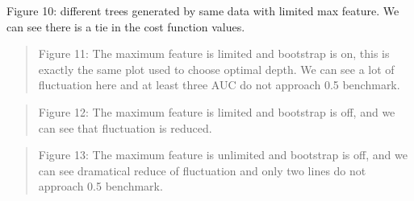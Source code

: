 \documentclass{article}
\newcommand{\ciapdf}[1]{\vspace*{-\parskip}\begin{center}\resizebox{0.75\textwidth}{!}{\texttt{[image: \#1]}}\end{center}}
\begin{document}
\vspace*{-\parskip}

Figure 10:
different trees generated by same data with limited max feature. We can see
there is a tie in the cost function values.

\ciapdf{app_samedata_1.pdf}

\ciapdf{app_samedata_2.pdf}

\ciapdf{Figure_8.pdf}
\begin{quote}
Figure 11: The maximum feature is limited and bootstrap is on, this is
exactly the same plot used to choose optimal depth. We can see a lot of
fluctuation here and at least three AUC do not approach 0.5 benchmark.
\end{quote}

\ciapdf{Figure_9.pdf}
\begin{quote}
Figure 12: The maximum feature is limited and bootstrap is off, and we can
see that fluctuation is reduced.
\end{quote}

\ciapdf{Figure_10.pdf}
\begin{quote}
Figure 13: The maximum feature is unlimited and bootstrap is off, and we
can see dramatical reduce of fluctuation and only two lines do not
approach 0.5 benchmark.
\end{quote}
\end{document}

